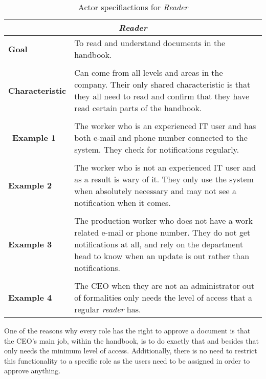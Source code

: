 \begin{table}[H]
	\centering
	\begin{tabular}{l p{11.3cm}}
		\hline
		\multicolumn{2}{c}{\textbf{\textit{Reader}}}\\
		\hline

		\textbf{Goal} & To read and understand documents in the handbook. \\
		&  \\

		\textbf{Characteristic} & Can come from all levels and areas in the company.
		Their only shared characteristic is that they all need to read and confirm that they have read certain parts of the handbook.\\
		&  \\
		\
		\textbf{Example 1}
		& The worker who is an experienced IT user and has both e-mail and phone number connected to the system.
		They check for notifications regularly.\\
		&  \\

		\textbf{Example 2}
		& The worker who is not an experienced IT user and as a result is wary of it.
		They only use the system when absolutely necessary and may not see a notification when it comes.\\

		&  \\
		\textbf{Example 3}
		& The production worker who does not have a work related e-mail or phone number.
		They do not get notifications at all, and rely on the department head to know when an update is out rather than notifications.\\
		&  \\

		\textbf{Example 4}
		& The CEO when they are not an administrator out of formalities only needs the level of access that a regular \textit{reader} has.\\

		\hline
	\end{tabular}
	\caption{Actor specifiactions for \textit{Reader}}\label{tab:Actor-reader}
\end{table}

One of the reasons why every role has the right to approve a document is that the CEO's main job, within the handbook, is to do exactly that and besides that only needs the minimum level of access.
Additionally, there is no need to restrict this functionality to a specific role as the users need to be assigned in order to approve anything.
